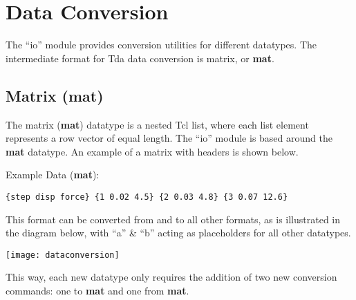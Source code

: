 \section{Data Conversion}
The ``io'' module provides conversion utilities for different datatypes.  The intermediate format for Tda data conversion is matrix, or \textbf{mat}. 
\subsection{Matrix (mat)}
The matrix (\textbf{mat}) datatype is a nested Tcl list, where each list element represents a row vector of equal length. The ``io'' module is based around the \textbf{mat} datatype. An example of a matrix with headers is shown below. 
\begin{example}{Example Data (\textbf{mat}):}
\begin{lstlisting}
{step disp force} {1 0.02 4.5} {2 0.03 4.8} {3 0.07 12.6}
\end{lstlisting}
\end{example}
This format can be converted from and to all other formats, as is illustrated in the diagram below, with ``a'' \& ``b'' acting as placeholders for all other datatypes.
\begin{center}
\texttt{[image: dataconversion]}
\end{center}
This way, each new datatype only requires the addition of two new conversion commands: one to \textbf{mat} and one from \textbf{mat}.
\clearpage
